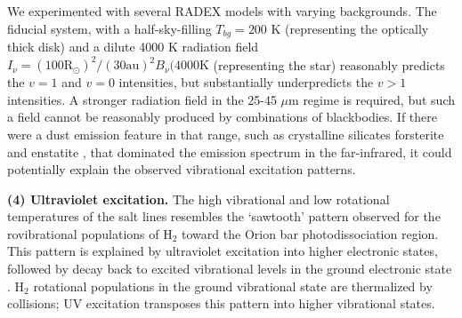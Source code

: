 \documentclass[12pt]{article}
\newcommand{\hh}{\ensuremath{\textrm{H}_{2}}\xspace}			%
\newcommand{\um}{\ensuremath{\mu \textrm{m}}\xspace}    %
\begin{document}
We experimented with several RADEX models with varying backgrounds.  The
fiducial system, with a half-sky-filling $T_{bg}=200$ K (representing the
optically thick disk) and a dilute 4000 K radiation field $I_{\nu} = (100
\mathrm{R_\odot})^2 / (30 \mathrm{au})^2 B_\nu(4000 \mathrm{K}$ (representing
the star) reasonably predicts the $v=1$ and $v=0$ intensities, but
substantially underpredicts the $v>1$ intensities.  A stronger radiation
field in the 25-45 \um regime is required, but such a field cannot be
reasonably produced by combinations of blackbodies.  If there were a dust
emission feature in that range, such as crystalline silicates forsterite
and enstatite \cite{Molster2005a}, that dominated the emission spectrum
in the far-infrared, it could potentially explain the observed vibrational
excitation patterns.



\par{\textbf{(4) Ultraviolet excitation.}}
%
%
The high vibrational and low rotational temperatures of the
salt lines resembles the `sawtooth' pattern observed for the rovibrational
populations of \hh toward the Orion bar photodissociation region.  This
pattern is explained by ultraviolet excitation into higher electronic states,
followed by decay back to excited vibrational levels in the ground electronic
state \cite{Kaplan2017a}.  \hh rotational populations in the ground vibrational
state are thermalized by collisions; UV excitation transposes this pattern into
higher vibrational states.
\end{document}
